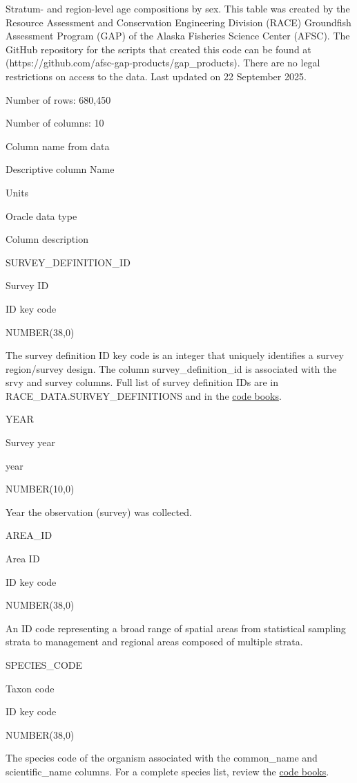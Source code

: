 \documentclass[
  letterpaper,
  oneside,
  open=any]{scrbook}
\begin{document}
Stratum- and region-level age compositions by sex. This table was
created by the Resource Assessment and Conservation Engineering Division
(RACE) Groundfish Assessment Program (GAP) of the Alaska Fisheries
Science Center (AFSC). The GitHub repository for the scripts that
created this code can be found at
(https://github.com/afsc-gap-products/gap\_products). There are no legal
restrictions on access to the data. Last updated on 22 September 2025.

Number of rows: 680,450

Number of columns: 10

Column name from data

Descriptive column Name

Units

Oracle data type

Column description

SURVEY\_DEFINITION\_ID

Survey ID

ID key code

NUMBER(38,0)

The survey definition ID key code is an integer that uniquely identifies
a survey region/survey design. The column survey\_definition\_id is
associated with the srvy and survey columns. Full list of survey
definition IDs are in RACE\_DATA.SURVEY\_DEFINITIONS and in the
\href{https://www.fisheries.noaa.gov/resource/document/groundfish-survey-species-code-manual-and-data-codes-manual}{code
books}.

YEAR

Survey year

year

NUMBER(10,0)

Year the observation (survey) was collected.

AREA\_ID

Area ID

ID key code

NUMBER(38,0)

An ID code representing a broad range of spatial areas from statistical
sampling strata to management and regional areas composed of multiple
strata.

SPECIES\_CODE

Taxon code

ID key code

NUMBER(38,0)

The species code of the organism associated with the common\_name and
scientific\_name columns. For a complete species list, review the
\href{https://www.fisheries.noaa.gov/resource/document/groundfish-survey-species-code-manual-and-data-codes-manual}{code
books}.
\end{document}
